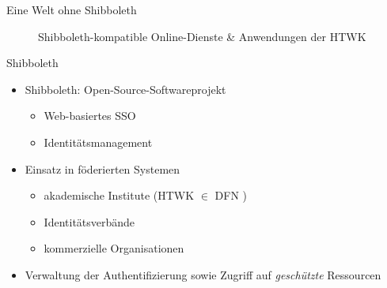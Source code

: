 \begin{frame}{Eine Welt ohne Shibboleth}
\begin{figure}
        \caption{Shibboleth-kompatible Online-Dienste \& Anwendungen der HTWK~\cite{hochschulefuertechnikwirtschaftundkulturleipzigMedienOnlineNutzen}}
    \end{figure}
\end{frame}


\begin{frame}{Shibboleth}
    \begin{itemize}
        \item \alert{Shibboleth}: Open-Source-Softwareprojekt
        \begin{itemize}
            \item Web-basiertes SSO
            \item Identitätsmanagement \cite{shibbolethShibbolethConsortium2024, cantorConsortiumFAQShibboleth2023}
        \end{itemize}

        \pause

        \item Einsatz in föderierten Systemen
        \begin{itemize}
            \item akademische Institute (HTWK $\in$ DFN \cite{hochschulefuertechnikwirtschaftundkulturleipzigMedienOnlineNutzen})
            \item Identitätsverbände
            \item kommerzielle Organisationen \cite{shibbolethShibbolethConsortium2024, shibbolethOurMembers2024}
        \end{itemize}

        \pause

        \item Verwaltung der Authentifizierung sowie Zugriff auf \emph{geschützte} Ressourcen \cite{cantorConsortiumFAQShibboleth2023}
    \end{itemize}
\end{frame}

